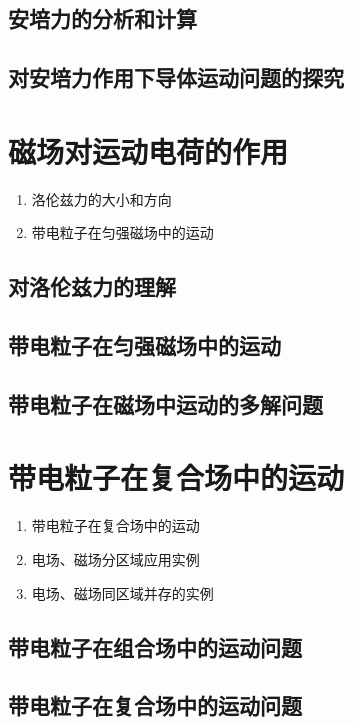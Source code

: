 \documentclass[cn,11pt,mac, simple]{elegantbook}
\begin{document}
\clearpage\section{安培力的分析和计算}

\clearpage\section{对安培力作用下导体运动问题的探究}

\chapter{磁场对运动电荷的作用}
\begin{enumerate}
   \item 洛伦兹力的大小和方向
   \item 带电粒子在匀强磁场中的运动
\end{enumerate}

\clearpage\section{对洛伦兹力的理解}

\clearpage\section{带电粒子在匀强磁场中的运动}

\clearpage\section{带电粒子在磁场中运动的多解问题}

\chapter{带电粒子在复合场中的运动}
\begin{enumerate}
   \item 带电粒子在复合场中的运动
   \item 电场、磁场分区域应用实例
   \item 电场、磁场同区域并存的实例
\end{enumerate}

\clearpage\section{带电粒子在组合场中的运动问题}

\clearpage\section{带电粒子在复合场中的运动问题}
\end{document}
